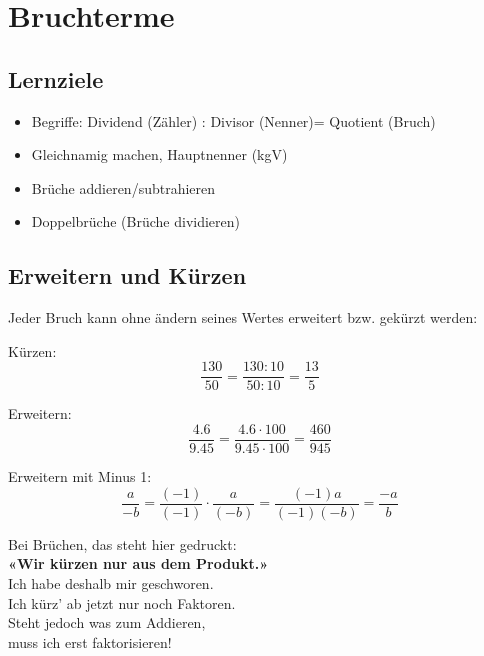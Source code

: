 \newpage
\section{Bruchterme}

\subsection*{Lernziele}

\begin{itemize}
	\item Begriffe: Dividend (Zähler) : Divisor (Nenner)= Quotient (Bruch)
	\item Gleichnamig machen, Hauptnenner (kgV)
	\item Brüche addieren/subtrahieren
	\item Doppelbrüche (Brüche dividieren) 
\end{itemize}

\newpage

\subsection{Erweitern und Kürzen}
Jeder Bruch kann ohne ändern seines Wertes erweitert bzw. gekürzt
werden:

Kürzen:
$$\frac{130}{50} = \frac{130 : 10}{50:10} =\frac{13}{5}$$

Erweitern:
$$\frac{4.6}{9.45} = \frac{4.6 \cdot{}100}{9.45\cdot{}100} =
\frac{460}{945}$$

Erweitern mit Minus 1:
$$\frac{a}{-b}
=\frac{(-1)}{(-1)} \cdot{}\frac{a}{(-b)}
= \frac{(-1)a}{(-1)(-b)}
= \frac{-a}{b}$$

\begin{rezept}{}{}

\begin{center}Bei Brüchen, das steht hier gedruckt:\\
\textbf{«Wir kürzen nur aus dem Produkt.»}\\

Ich habe deshalb mir geschworen.\\
Ich kürz' ab jetzt nur noch Faktoren.\\

Steht jedoch was zum Addieren,\\
muss ich erst faktorisieren!\\
\end{center}
\end{rezept}


